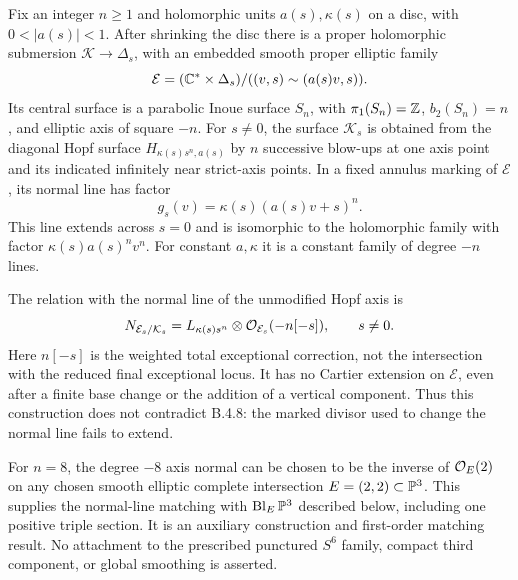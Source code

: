 \begin{proposition}
Fix an integer $n\ge1$ and holomorphic units $a(s),\kappa(s)$ on a
disc, with $0<|a(s)|<1$. After shrinking the disc there is a proper
holomorphic submersion $\mathcal K\to\Delta_s$, with an embedded smooth
proper elliptic family
\[
 \mathcal E=(\mathbb C^*\times\Delta_s)/
       ((v,s)\sim(a(s)v,s)).
\]
Its central surface is a parabolic Inoue surface $S_n$, with
$\pi_1(S_n)=\mathbb Z$, $b_2(S_n)=n$, and elliptic axis of square $-n$.
For $s\ne0$, the surface $\mathcal K_s$ is obtained from the diagonal
Hopf surface $H_{\kappa(s)s^n,a(s)}$ by $n$ successive blow-ups at one
axis point and its indicated infinitely near strict-axis points.
In a fixed annulus marking of $\mathcal E$, its normal line has factor
\[
 g_s(v)=\kappa(s)(a(s)v+s)^n.
\]
This line extends across $s=0$ and is isomorphic to the holomorphic
family with factor $\kappa(s)a(s)^n v^n$.
For constant $a,\kappa$ it is a constant family of degree $-n$ lines.

The relation with the normal line of the unmodified Hopf axis is
\[
 N_{\mathcal E_s/\mathcal K_s}
   =L_{\kappa(s)s^n}\otimes\mathcal O_{\mathcal E_s}(-n[-s]),
       \qquad s\ne0.
\]
Here $n[-s]$ is the weighted total exceptional correction, not the
intersection with the reduced final exceptional locus. It has no
Cartier extension on $\mathcal E$, even after a finite base change or
the addition of a vertical component. Thus this construction does
not contradict B.4.8: the marked divisor used to change the normal
line fails to extend.

For $n=8$, the degree $-8$ axis normal can be chosen to be the inverse
of $\mathcal O_E(2)$ on any chosen smooth elliptic complete intersection
$E=(2,2)\subset\mathbb P^3$. This supplies the normal-line matching with
$\operatorname{Bl}_E\mathbb P^3$ described below, including one positive
triple section. It is an auxiliary construction and first-order
matching result. No attachment to the prescribed punctured
$S^6$ family, compact third component, or global smoothing is asserted.
\end{proposition}
